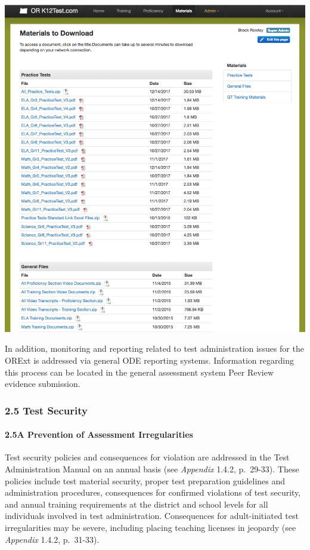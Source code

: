 \documentclass[]{article}
\let\oldparagraph\paragraph
\renewcommand{\paragraph}[1]{\oldparagraph{#1}\mbox{}}
\begin{document}
\FloatBarrier  \includegraphics{Figures/TrainingSite/Downloads.png}

In addition, monitoring and reporting related to test administration
issues for the ORExt is addressed via general ODE reporting systems.
Information regarding this process can be located in the general
assessment system Peer Review evidence submission.

\subsubsection{2.5 Test Security}\label{test-security}

\paragraph{2.5A Prevention of Assessment
Irregularities}\label{a-prevention-of-assessment-irregularities}

Test security policies and consequences for violation are addressed in
the Test Administration Manual on an annual basis (see \emph{Appendix}
1.4.2, p.~29-33). These policies include test material security, proper
test preparation guidelines and administration procedures, consequences
for confirmed violations of test security, and annual training
requirements at the district and school levels for all individuals
involved in test administration. Consequences for adult-initiated test
irregularities may be severe, including placing teaching licenses in
jeopardy (see \emph{Appendix} 1.4.2, p.~31-33).
\end{document}

